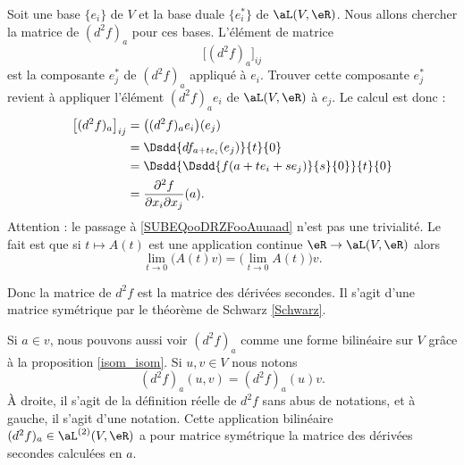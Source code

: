 Soit une base \( \{ e_i \}\) de \( V\) et la base duale \( \{ e_i^* \}\) de \( \aL(V,\eR)\). Nous allons chercher la matrice de \( (d^2f)_a\) pour ces bases. L'élément de matrice
\begin{equation}
    \big[ (d^2f)_a \big]_{ij}
\end{equation}
est la composante \( e_j^*\) de \( (d^2f)_a\) appliqué à \( e_i\). Trouver cette composante \( e_j^*\) revient à appliquer l'élément \( (d^2f)_ae_i\) de \( \aL(V,\eR)\) à \( e_j\). Le calcul est donc :
\begin{subequations}
    \begin{align}
        \big[ (d^2f)_{a} \big]_{ij}&=\big( (d^2f)_ae_i \big)(e_j)\\
        &=\Dsdd{ df_{a+te_i}(e_j) }{t}{0}       \label{SUBEQooDRZFooAuuaad}\\
        &=\Dsdd{    \Dsdd{ f(a+te_i+se_j) }{s}{0}    }{t}{0}\\
        &=\frac{ \partial^2f }{ \partial x_i\partial x_j }(a).
    \end{align}
\end{subequations}
Attention : le passage à \eqref{SUBEQooDRZFooAuuaad} n'est pas une trivialité. Le fait est que si \( t\mapsto A(t)\) est une application continue \( \eR\to \aL(V,\eR)\) alors 
\begin{equation}
    \lim_{t\to 0} \big( A(t)v \big)=\big( \lim_{t\to 0} A(t) \big)v.
\end{equation}

Donc la matrice de \( d^2f  \) est la matrice des dérivées secondes. Il s'agit d'une matrice symétrique par le théorème de Schwarz \ref{Schwarz}.

\begin{normaltext}      \label{NORMooZAOEooGqjpLH}
    Si \( a\in v\), nous pouvons aussi voir \( (d^2f)_a\) comme une forme bilinéaire sur \( V\) grâce à la proposition \ref{isom_isom}. Si \( u,v\in V\) nous notons
    \begin{equation}
        (d^2f)_a(u,v)=(d^2f)_a(u)v.
    \end{equation}
    À droite, il s'agit de la définition réelle de \( d^2f\) sans abus de notations, et à gauche, il s'agit d'une notation. Cette application bilinéaire \( (d^2f)_a\in \aL^{(2)}(V,\eR)\) a pour matrice symétrique la matrice des dérivées secondes calculées en \( a\).
\end{normaltext}

